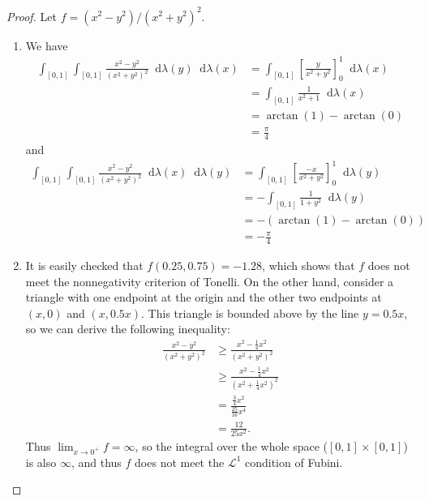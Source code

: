 \documentclass[12pt]{article}
\newcommand{\dd}{\mathop{}\!\mathrm{d}}
\theoremstyle{definition}
\begin{document}
\begin{proof}
	Let $f = (x^2-y^2)/(x^2+y^2)^2$.
	\begin{enumerate}[label=(\alph*)]
		\item We have \begin{align*}
			      \int_{[0,1]}\int_{[0,1]} \frac{x^2-y^2}{(x^2+y^2)^2} \dd\lambda(y)\dd\lambda(x) & = \int_{[0,1]} \left[\frac{y}{x^2+y^2}\right]_0^1 \dd\lambda(x) \\
			                                                                                      & = \int_{[0,1]} \frac{1}{x^2+1} \dd\lambda(x)                    \\
			                                                                                      & = \arctan(1) - \arctan(0)                                       \\
			                                                                                      & = \frac{\pi}{4}
		      \end{align*}
		      and \begin{align*}
			      \int_{[0,1]}\int_{[0,1]} \frac{x^2-y^2}{(x^2+y^2)^2} \dd\lambda(x)\dd\lambda(y) & = \int_{[0,1]} \left[\frac{-x}{x^2 + y^2}\right]_0^1 \dd\lambda(y) \\
			                                                                                      & = -\int_{[0,1]} \frac{1}{1 + y^2} \dd\lambda(y)                    \\
			                                                                                      & = -(\arctan(1) - \arctan(0))                                       \\
			                                                                                      & = -\frac{\pi}{4}
		      \end{align*}
		\item It is easily checked that $f(0.25, 0.75) = -1.28$, which shows that $f$ does not meet the nonnegativity criterion of Tonelli.
		      On the other hand, consider a triangle with one endpoint at the origin and the other two endpoints at $(x, 0)$ and $(x, 0.5x)$.
		      This triangle is bounded above by the line $y=0.5x$, so we can derive the following inequality: \begin{align*}
			      \frac{x^2-y^2}{(x^2+y^2)^2} & \geq \frac{x^2-\frac{1}{4}x^2}{\left(x^2+y^2\right)^2}            \\
			                                  & \geq \frac{x^2-\frac{1}{4}x^2}{\left(x^2+\frac{1}{4}x^2\right)^2} \\
			                                  & = \frac{\frac{3}{4}x^2}{\frac{25}{16}x^4}                         \\
			                                  & = \frac{12}{25x^2}.
		      \end{align*}
		      Thus $\lim_{x\to0^+} f = \infty$, so the integral over the whole space ($[0,1] \times [0,1]$) is also $\infty$, and thus $f$ does not meet the $\mathcal{L}^1$ condition of Fubini.
	\end{enumerate}
\end{proof}
\end{document}
